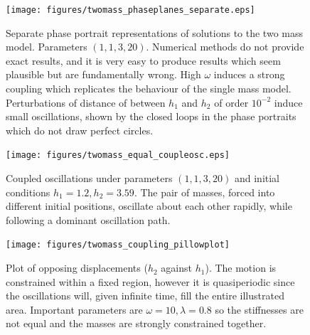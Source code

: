 \begin{figure}[h!]
    \centering
    \texttt{[image: figures/twomass\_phaseplanes\_separate.eps]}
    \caption{
        Separate phase portrait representations of solutions to the two mass model.
        Parameters \((1,1,3,20)\). Numerical methods do not provide exact results,
        and it is very easy to produce results which seem plausible but are fundamentally wrong. High $\omega$ induces a strong coupling which replicates the behaviour of the single mass model.
        Perturbations of distance of between $h_1$ and $h_2$ of order $10^{-2}$ induce small oscillations,
        shown by the closed loops in the phase portraits which do not draw perfect circles.
    }
    \label{fig:twomass_phaseportrait_replicated}
\end{figure}

\begin{figure}[h!]
    \centering
    \texttt{[image: figures/twomass\_equal\_coupleosc.eps]}
    \caption{Coupled oscillations under parameters \((1, 1, 3, 20)\) and initial conditions \(h_1 = 1.2, h_2 = 3.59\).
    The pair of masses, forced into different initial positions,
    oscillate about each other rapidly, while following a dominant oscillation path.}
    \label{fig:twomass_dominant_osc}
\end{figure}

\begin{figure}[h!]
    \centering
    \texttt{[image: figures/twomass\_coupling\_pillowplot]}
    \caption{
        Plot of opposing displacements ($h_2$ against $h_1$). The motion is constrained within a fixed region,
        however it is quasiperiodic since the oscillations will, given infinite time, fill the entire illustrated area.
        Important parameters are \(\omega = 10, \lambda = 0.8\) so the stiffnesses are not equal and the masses are strongly constrained together.
    }
    \label{fig:twomass_quasiperiodic}
\end{figure} %

